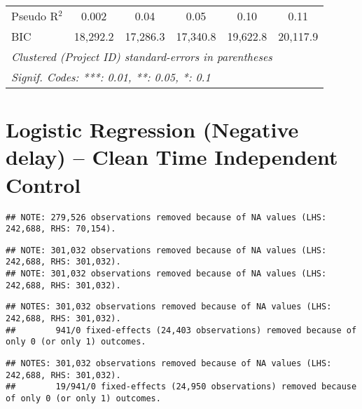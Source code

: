 \documentclass[
]{article}
\begin{document}
\begin{table}[htbp]
\begin{tabular}{lccccc}
      Pseudo R$^2$                 & 0.002         & 0.04          & 0.05          & 0.10          & 0.11\\  
      BIC                          & 18,292.2      & 17,286.3      & 17,340.8      & 19,622.8      & 20,117.9\\  
      \midrule \midrule
      \multicolumn{6}{l}{\emph{Clustered (Project ID) standard-errors in parentheses}}\\
      \multicolumn{6}{l}{\emph{Signif. Codes: ***: 0.01, **: 0.05, *: 0.1}}\\
   \end{tabular}
\end{table}

\hypertarget{logistic-regression-negative-delay-clean-time-independent-control}{%
\section{Logistic Regression (Negative delay) -- Clean Time Independent
Control}\label{logistic-regression-negative-delay-clean-time-independent-control}}

\begin{verbatim}
## NOTE: 279,526 observations removed because of NA values (LHS: 242,688, RHS: 70,154).
\end{verbatim}

\begin{verbatim}
## NOTE: 301,032 observations removed because of NA values (LHS: 242,688, RHS: 301,032).
## NOTE: 301,032 observations removed because of NA values (LHS: 242,688, RHS: 301,032).
\end{verbatim}

\begin{verbatim}
## NOTES: 301,032 observations removed because of NA values (LHS: 242,688, RHS: 301,032).
##        941/0 fixed-effects (24,403 observations) removed because of only 0 (or only 1) outcomes.
\end{verbatim}

\begin{verbatim}
## NOTES: 301,032 observations removed because of NA values (LHS: 242,688, RHS: 301,032).
##        19/941/0 fixed-effects (24,950 observations) removed because of only 0 (or only 1) outcomes.
\end{verbatim}
\end{document}
